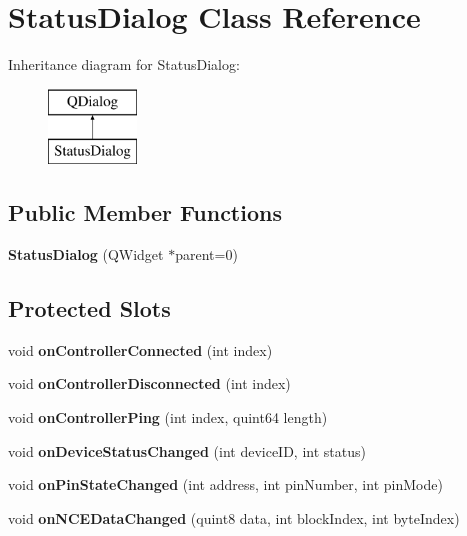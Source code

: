 \hypertarget{class_status_dialog}{}\section{Status\+Dialog Class Reference}
\label{class_status_dialog}
Inheritance diagram for Status\+Dialog\+:\begin{figure}[H]
\begin{center}
\leavevmode
\includegraphics[height=2.000000cm]{class_status_dialog}
\end{center}
\end{figure}
\subsection*{Public Member Functions}
\begin{DoxyCompactItemize}
\item 
\mbox{\label{class_status_dialog_a814831672ff09b7e3c03b61e25fe7a5d}} 
{\bfseries Status\+Dialog} (Q\+Widget $\ast$parent=0)
\end{DoxyCompactItemize}
\subsection*{Protected Slots}
\begin{DoxyCompactItemize}
\item 
\mbox{\label{class_status_dialog_a070ec51a69f12ddc1f8ee2a89572653b}} 
void {\bfseries on\+Controller\+Connected} (int index)
\item 
\mbox{\label{class_status_dialog_ac40b32574e672937d93721699d5c6fe6}} 
void {\bfseries on\+Controller\+Disconnected} (int index)
\item 
\mbox{\label{class_status_dialog_a9dd8cc9ccc2786d50ac5ac2c3ff46253}} 
void {\bfseries on\+Controller\+Ping} (int index, quint64 length)
\item 
\mbox{\label{class_status_dialog_a09e16d6a6e98ad4088b261ee2692f1ae}} 
void {\bfseries on\+Device\+Status\+Changed} (int device\+ID, int status)
\item 
\mbox{\label{class_status_dialog_a97af838c425027913920559f9e4e3bfe}} 
void {\bfseries on\+Pin\+State\+Changed} (int address, int pin\+Number, int pin\+Mode)
\item 
\mbox{\label{class_status_dialog_a750b9f3c081f4e04c7981a42915168be}} 
void {\bfseries on\+N\+C\+E\+Data\+Changed} (quint8 data, int block\+Index, int byte\+Index)
\end{DoxyCompactItemize}


